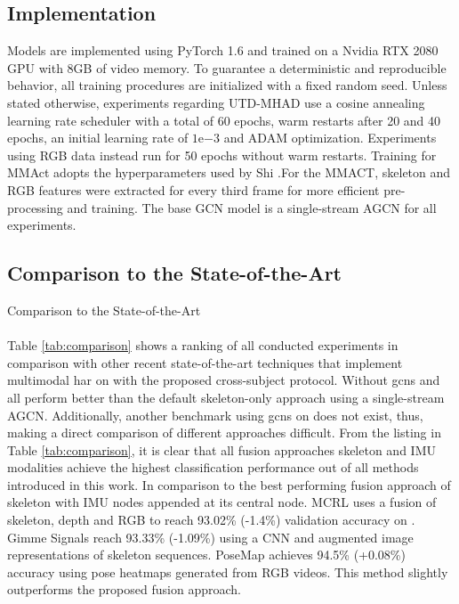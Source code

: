 \subsection{Implementation}

Models are implemented using PyTorch 1.6 and trained on a Nvidia RTX 2080 GPU with 8GB of video memory. To guarantee a deterministic and reproducible behavior, all training procedures are initialized with a fixed random seed. Unless stated otherwise, experiments regarding UTD-MHAD use a cosine annealing learning rate scheduler \cite{DBLP:conf/iclr/LoshchilovH17} with a total of 60 epochs, warm restarts after 20 and 40 epochs, an initial learning rate of $1\mathrm{e}{-3}$ and ADAM \cite{DBLP:journals/corr/KingmaB14} optimization. Experiments using RGB data instead run for 50 epochs without warm restarts. Training for MMAct adopts the hyperparameters used by Shi \andothers\cite{DBLP:conf/cvpr/ShiZCL19a}.For the MMACT, skeleton and RGB features were extracted for every third frame for more efficient pre-processing and training. 
The base GCN model is a single-stream AGCN for all experiments.


\subsection{Comparison to the State-of-the-Art}

\begin{table}[h]
    
    \centering
    \subfloat[MMAct]{
        \tablemmact
    }
    \caption{Comparison to the State-of-the-Art}
\end{table}
\paragraph{\utdmhad{}}
Table \ref{tab:comparison} shows a ranking of all conducted experiments in comparison with other recent state-of-the-art techniques that implement multimodal \gls{har} on \utdmhad{} with the proposed cross-subject protocol. Without \glspl{gcn} and all perform better than the default skeleton-only approach using a single-stream AGCN. 
Additionally, another benchmark using \glspl{gcn} on \utdmhad{} does not exist, thus, making a direct comparison of different approaches difficult. From the listing in Table \ref{tab:comparison}, it is clear that all fusion approaches skeleton and IMU modalities achieve the highest classification performance out of all methods introduced in this work. 
In comparison to the best performing fusion approach of skeleton with IMU nodes appended at its central node.
MCRL \cite{2019ISenJ..19.1862L} uses a fusion of skeleton, depth and RGB to reach 93.02\% (-1.4\%) validation accuracy on \utdmhad{}. Gimme Signals \cite{DBLP:conf/iros/MemmesheimerTP20} reach 93.33\% (-1.09\%) using a CNN and augmented image representations of skeleton sequences. PoseMap \cite{DBLP:conf/cvpr/LiuY18} achieves 94.5\% (+0.08\%) accuracy using pose heatmaps generated from RGB videos. This method slightly outperforms the proposed fusion approach.



